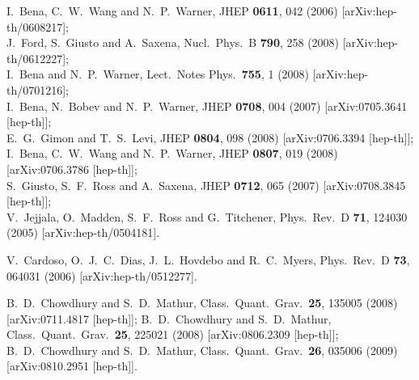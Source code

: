 \documentclass[12pt]{article}
\begin{document}
\begin{thebibliography}{10}
I.~Bena, C.~W.~Wang and N.~P.~Warner,
  JHEP {\bf 0611}, 042 (2006)
  [arXiv:hep-th/0608217];\\
J.~Ford, S.~Giusto and A.~Saxena,
  Nucl.\ Phys.\  B {\bf 790}, 258 (2008)
  [arXiv:hep-th/0612227];\\
I.~Bena and N.~P.~Warner,
  Lect.\ Notes Phys.\  {\bf 755}, 1 (2008)
  [arXiv:hep-th/0701216];\\
I.~Bena, N.~Bobev and N.~P.~Warner,
  JHEP {\bf 0708}, 004 (2007)
  [arXiv:0705.3641 [hep-th]];\\
E.~G.~Gimon and T.~S.~Levi,
  JHEP {\bf 0804}, 098 (2008)
  [arXiv:0706.3394 [hep-th]];\\
I.~Bena, C.~W.~Wang and N.~P.~Warner,
  JHEP {\bf 0807}, 019 (2008)
  [arXiv:0706.3786 [hep-th]];\\
  S.~Giusto, S.~F.~Ross and A.~Saxena,
  JHEP {\bf 0712}, 065 (2007)
  [arXiv:0708.3845 [hep-th]];\\


  
  V.~Jejjala, O.~Madden, S.~F.~Ross and G.~Titchener,
  Phys.\ Rev.\  D {\bf 71}, 124030 (2005)
  [arXiv:hep-th/0504181].

  V.~Cardoso, O.~J.~C.~Dias, J.~L.~Hovdebo and R.~C.~Myers,
  Phys.\ Rev.\  D {\bf 73}, 064031 (2006)
  [arXiv:hep-th/0512277].


  
  B.~D.~Chowdhury and S.~D.~Mathur,
  Class.\ Quant.\ Grav.\  {\bf 25}, 135005 (2008)
  [arXiv:0711.4817 [hep-th]];
  B.~D.~Chowdhury and S.~D.~Mathur,
  Class.\ Quant.\ Grav.\  {\bf 25}, 225021 (2008)
  [arXiv:0806.2309 [hep-th]];
  B.~D.~Chowdhury and S.~D.~Mathur,
  Class.\ Quant.\ Grav.\  {\bf 26}, 035006 (2009)
  [arXiv:0810.2951 [hep-th]].


\end{thebibliography}
\end{document}
